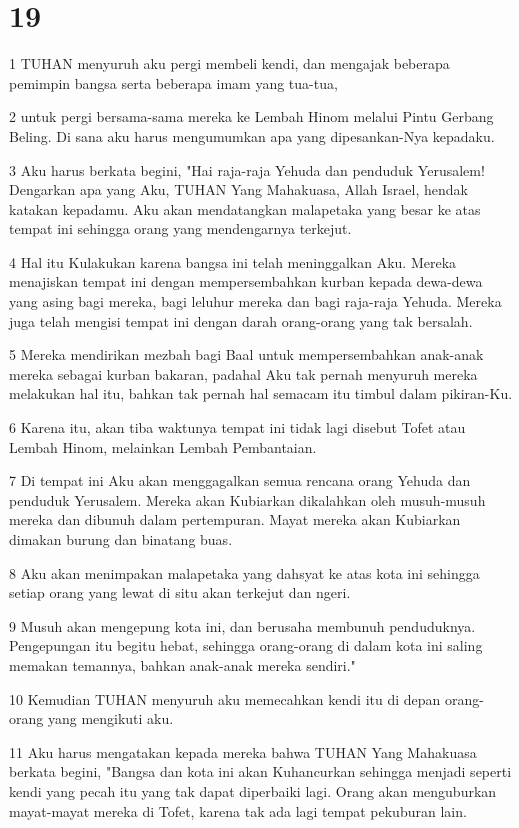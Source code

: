 \chapter{19}

\par 1 TUHAN menyuruh aku pergi membeli kendi, dan mengajak beberapa pemimpin bangsa serta beberapa imam yang tua-tua,
\par 2 untuk pergi bersama-sama mereka ke Lembah Hinom melalui Pintu Gerbang Beling. Di sana aku harus mengumumkan apa yang dipesankan-Nya kepadaku.
\par 3 Aku harus berkata begini, "Hai raja-raja Yehuda dan penduduk Yerusalem! Dengarkan apa yang Aku, TUHAN Yang Mahakuasa, Allah Israel, hendak katakan kepadamu. Aku akan mendatangkan malapetaka yang besar ke atas tempat ini sehingga orang yang mendengarnya terkejut.
\par 4 Hal itu Kulakukan karena bangsa ini telah meninggalkan Aku. Mereka menajiskan tempat ini dengan mempersembahkan kurban kepada dewa-dewa yang asing bagi mereka, bagi leluhur mereka dan bagi raja-raja Yehuda. Mereka juga telah mengisi tempat ini dengan darah orang-orang yang tak bersalah.
\par 5 Mereka mendirikan mezbah bagi Baal untuk mempersembahkan anak-anak mereka sebagai kurban bakaran, padahal Aku tak pernah menyuruh mereka melakukan hal itu, bahkan tak pernah hal semacam itu timbul dalam pikiran-Ku.
\par 6 Karena itu, akan tiba waktunya tempat ini tidak lagi disebut Tofet atau Lembah Hinom, melainkan Lembah Pembantaian.
\par 7 Di tempat ini Aku akan menggagalkan semua rencana orang Yehuda dan penduduk Yerusalem. Mereka akan Kubiarkan dikalahkan oleh musuh-musuh mereka dan dibunuh dalam pertempuran. Mayat mereka akan Kubiarkan dimakan burung dan binatang buas.
\par 8 Aku akan menimpakan malapetaka yang dahsyat ke atas kota ini sehingga setiap orang yang lewat di situ akan terkejut dan ngeri.
\par 9 Musuh akan mengepung kota ini, dan berusaha membunuh penduduknya. Pengepungan itu begitu hebat, sehingga orang-orang di dalam kota ini saling memakan temannya, bahkan anak-anak mereka sendiri."
\par 10 Kemudian TUHAN menyuruh aku memecahkan kendi itu di depan orang-orang yang mengikuti aku.
\par 11 Aku harus mengatakan kepada mereka bahwa TUHAN Yang Mahakuasa berkata begini, "Bangsa dan kota ini akan Kuhancurkan sehingga menjadi seperti kendi yang pecah itu yang tak dapat diperbaiki lagi. Orang akan menguburkan mayat-mayat mereka di Tofet, karena tak ada lagi tempat pekuburan lain.
